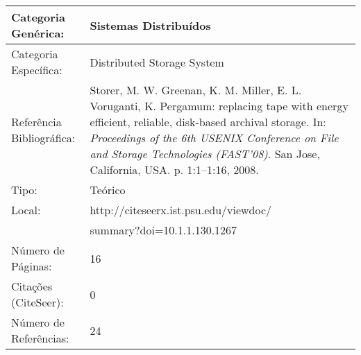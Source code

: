 \documentclass[10pt,a4paper]{article}
\begin{document}
\begin{center}
\begin{tabular}{|p{5cm}||p{10cm}|}
\hline

Categoria Genérica: & Sistemas Distribuídos\\\hline
Categoria Específica: & Distributed Storage System\\\hline
Referência Bibliográfica: & Storer, M. W.  Greenan, K. M. Miller, E. L. Voruganti, K. Pergamum: replacing tape with energy efficient, reliable, disk-based archival storage. In:  \emph{Proceedings of the 6th USENIX Conference on File and Storage Technologies (FAST'08)}. San Jose, California, USA. p. 1:1--1:16, 2008.\\\hline
Tipo: & Teórico\\\hline
Local: & http://citeseerx.ist.psu.edu/viewdoc/\\ &summary?doi=10.1.1.130.1267\\\hline
Número de Páginas: & 16\\\hline
Citações (CiteSeer): & 0\\\hline
Número de Referências: & 24\\\hline

\end{tabular}
\end{center}
\end{document}

